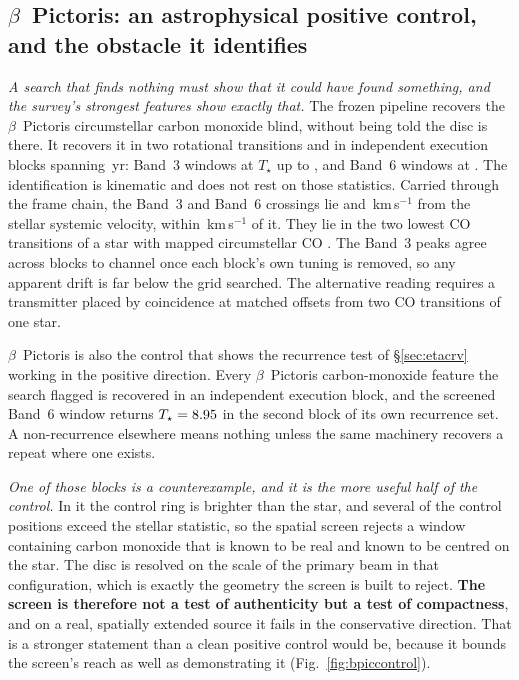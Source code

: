 \subsection{$\beta$~Pictoris: an astrophysical positive control, and the
obstacle it identifies} \label{sec:bpicval}

\emph{A search that finds nothing must show that it could have found
something, and the survey's strongest features show exactly that.} The
frozen pipeline recovers the $\beta$~Pictoris circumstellar carbon monoxide
blind, without being told the disc is there. It recovers it in two
rotational transitions and in \NStageOneBpicEb{} independent execution
blocks spanning \BpBaselineYr\,yr: \BpicNFlagThree{} Band~3 windows at
$T_\star$ up to \BpicBThreeTsym, and \BpicNFlagSix{} Band~6 windows at
\BpicBSixTsym. The identification is kinematic and does not rest on those
statistics. Carried through the frame chain, the Band~3 and Band~6 crossings
lie \StelBpicThree{} and \StelBpicSix\,km\,s$^{-1}$ from the stellar
systemic velocity, within \BpicMaxAbsStel\,km\,s$^{-1}$ of it. They lie in
the two lowest CO transitions of a star with mapped circumstellar CO
\citep{Dent2014,Matra2017}. The Band~3 peaks agree across blocks to
\BpRecThreeTuneChanMax{} channel once each block's own tuning is removed, so
any apparent drift is far below the grid searched. The alternative reading
requires a transmitter placed by coincidence at matched offsets from two CO
transitions of one star.

$\beta$~Pictoris is also the control that shows the recurrence test of
\S\ref{sec:etacrv} working in the positive direction. Every
$\beta$~Pictoris carbon-monoxide feature the search flagged is recovered in
an independent execution block, and the screened Band~6 window returns
$T_\star=8.95{}$ in the second block of its own recurrence set. A
non-recurrence elsewhere means nothing unless the same machinery recovers a
repeat where one exists.

\emph{One of those blocks is a counterexample, and it is the more useful
half of the control.} In it the control ring is brighter than the star, and
several of the \NCtrl{} control positions exceed the stellar statistic, so
the spatial screen rejects a window containing carbon monoxide that is known
to be real and known to be centred on the star. The disc is resolved on the
scale of the primary beam in that configuration, which is exactly the
geometry the screen is built to reject. \textbf{The screen is therefore not
a test of authenticity but a test of compactness}, and on a real,
spatially extended source it fails in the conservative direction. That is a
stronger statement than a clean positive control would be, because it bounds
the screen's reach as well as demonstrating it (Fig.~\ref{fig:bpiccontrol}).

